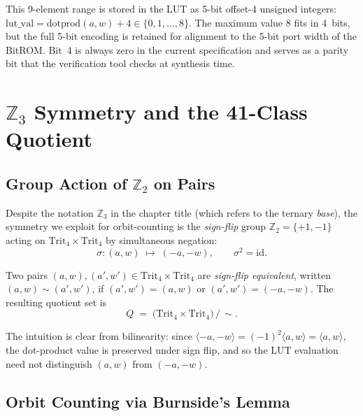 This 9-element range is stored in the LUT as 5-bit offset-4 unsigned
integers: \(\mathrm{lut\_val} = \mathrm{dotprod}(a,w) + 4 \in
\{0,1,\ldots,8\}\).  The maximum value 8 fits in 4~bits, but the
full 5-bit encoding is retained for alignment to the 5-bit port width
of the BitROM.  Bit~4 is always zero in the current specification and
serves as a parity bit that the verification tool checks at synthesis
time.

\section{\texorpdfstring{$\mathbb{Z}_3$}{Z3} Symmetry and the 41-Class Quotient}
\label{sec:z3}

\subsection{Group Action of \texorpdfstring{$\mathbb{Z}_2$}{Z2} on Pairs}
\label{subsec:z2_action}

Despite the notation \(\mathbb{Z}_3\) in the chapter title (which refers
to the ternary \emph{base}), the symmetry we exploit for orbit-counting
is the \emph{sign-flip} group \(\mathbb{Z}_2 = \{+1, -1\}\) acting on
\(\mathrm{Trit}_4 \times \mathrm{Trit}_4\) by simultaneous negation:
\[
  \sigma \colon (a, w) \;\mapsto\; (-a, -w),
  \qquad \sigma^2 = \mathrm{id}.
\]

\begin{definition}
\label{def:sign_flip}
Two pairs \((a,w), (a',w') \in \mathrm{Trit}_4 \times \mathrm{Trit}_4\)
are \emph{sign-flip equivalent}, written \((a,w) \sim (a',w')\), if
\((a',w') = (a,w)\) or \((a',w') = (-a,-w)\).  The resulting quotient
set is
\[
  Q \;=\; \bigl(\mathrm{Trit}_4 \times \mathrm{Trit}_4\bigr) \,/\, \sim.
\]
\end{definition}

The intuition is clear from bilinearity: since
\(\langle -a, -w \rangle = (-1)^2 \langle a, w \rangle = \langle a, w \rangle\),
the dot-product value is preserved under sign flip, and so the LUT
evaluation need not distinguish \((a,w)\) from \((-a,-w)\).

\subsection{Orbit Counting via Burnside's Lemma}
\label{subsec:burnside}

